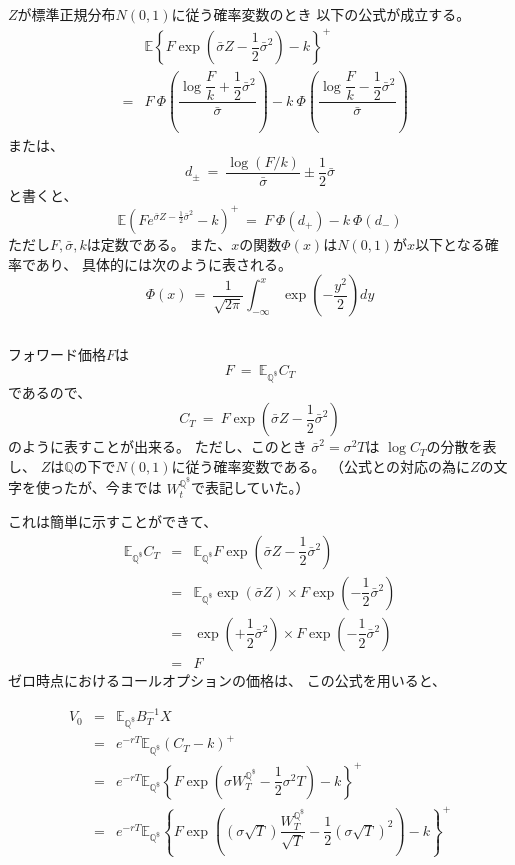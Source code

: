 \documentclass[uplatex,a4j,12pt,dvipdfmx]{jsarticle}
\begin{document}
$Z$が標準正規分布$N(0,1)$に従う確率変数のとき
以下の公式が成立する。
%
%
\begin{eqnarray*}
	&&
	\mathbb{E}
	\left\{
	F
	\exp
	\left(
	\bar{\sigma} Z - \dfrac{1}{2} \bar{\sigma}^{2}
	\right)
	-k
	\right\}^{+}
	\\ &=&
	F
	\ \! \Phi
	\left(
	\dfrac{
		\log \dfrac{F}{k} + \dfrac{1}{2} \bar{\sigma}^{2}
	}
	{\bar{\sigma}}
	\right)
	-
	k
	\ \! \Phi
	\left(
	\dfrac{
		\log \dfrac{F}{k} - \dfrac{1}{2} \bar{\sigma}^{2}
	}
	{\bar{\sigma}}
	\right)
\end{eqnarray*}
%
%
または、
$$
	d_{\pm}
	\ = \
	\dfrac{
		\log (F/k)
	}
	{\bar{\sigma}}
	\pm \dfrac{1}{2} \bar{\sigma}
$$
と書くと、
$$
	\mathbb{E}
	\left(
	F e^{\bar{\sigma}Z - \frac{1}{2} \bar{\sigma}^{2} }
	-
	k
	\right)^{+}
	\ = \
	F
	\ \! \Phi
	\left(
	d_{+}
	\right)
	-
	k
	\ \! \Phi
	\left(
	d_{-}
	\right)
$$
ただし$F,\bar{\sigma},k$は定数である。
また、$x$の関数$\Phi(x)$は$N(0,1)$が$x$以下となる確率であり、
具体的には次のように表される。
$$
	\Phi(x)
	\ = \
	\dfrac{1}{\sqrt{2 \pi}}
	\int^{x}_{- \infty} \exp \left( - \dfrac{y^{2}}{2} \right) dy
$$

${}$

フォワード価格$F$は
$$F \ = \ \mathbb{E}_{\mathbb{Q}^{\$}} C_{T} $$
であるので、
$$
	C_{T}
	\ = \
	F \exp \left( \bar{\sigma} Z - \dfrac{1}{2} \bar{\sigma}^{2} \right)
$$
のように表すことが出来る。
ただし、このとき
$\bar{\sigma}^{2} = \sigma^{2} T$は
$\log C_{T}$の分散を表し、
$Z$は$\mathbb{Q}$の下で$N(0,1)$に従う確率変数である。
（公式との対応の為に$Z$の文字を使ったが、今までは
$W^{\mathbb{Q}^{\$}}_{t}$で表記していた。）

これは簡単に示すことができて、
%
%
\begin{eqnarray*}
	\mathbb{E}_{\mathbb{Q}^{\$}} C_{T}
	&=&
	\mathbb{E}_{\mathbb{Q}^{\$}} F \exp \left( \bar{\sigma} Z - \dfrac{1}{2} \bar{\sigma}^{2} \right)
	\\ &=&
	\mathbb{E}_{\mathbb{Q}^{\$}} \exp \left( \bar{\sigma} Z \right)
	\times
	F \exp \left(- \dfrac{1}{2} \bar{\sigma}^{2} \right)
	\\ &=&
	\exp \left(+ \dfrac{1}{2} \bar{\sigma}^{2} \right)
	\times
	F \exp \left(- \dfrac{1}{2} \bar{\sigma}^{2} \right)
	\\ &=&
	F
\end{eqnarray*}
%
%
ゼロ時点におけるコールオプションの価格は、
この公式を用いると、

%
%
\begin{eqnarray*}
	V_{0}
	&=&
	\mathbb{E}_{\mathbb{Q}^{ \$ }}
	B_{T}^{-1} X
	\\ &=&
	e^{-rT}
	\mathbb{E}_{\mathbb{Q}^{ \$ }}
	(C_{T} - k)^{+}
	\\ &=&
	e^{-rT}
	\mathbb{E}_{\mathbb{Q}^{ \$ }}
	\left\{
	F
	\exp
	\left(
	\sigma W^{\mathbb{Q}^{\$}}_{T} - \dfrac{1}{2} \sigma^{2} T
	\right)
	-k
	\right\}^{+}
	\\ &=&
	e^{-rT}
	\mathbb{E}_{\mathbb{Q}^{ \$ }}
	\left\{
	F
	\exp
	\left(
	( \sigma \sqrt{T}) \dfrac{W^{\mathbb{Q}^{\$}}_{T}}{\sqrt{T}}
	- \dfrac{1}{2} (\sigma \sqrt{T})^{2}
	\right)
	-k
	\right\}^{+}
\end{eqnarray*}
%
%
\end{document}
